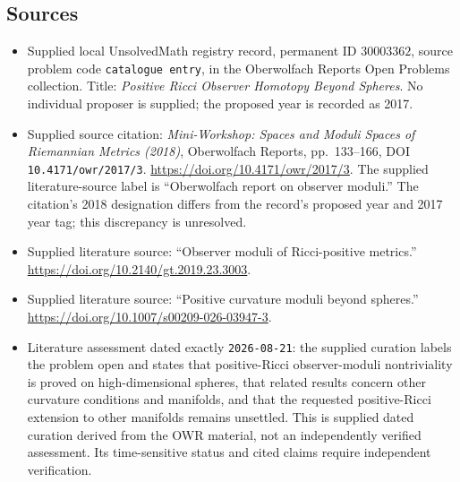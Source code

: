 \documentclass[11pt]{article}
\begin{document}
\subsection{Sources}
\begin{itemize}
\item Supplied local UnsolvedMath registry record, permanent ID \(30003362\), source problem code \texttt{catalogue entry}, in the Oberwolfach Reports Open Problems collection. Title: \emph{Positive Ricci Observer Homotopy Beyond Spheres}. No individual proposer is supplied; the proposed year is recorded as 2017.
\item Supplied source citation: \emph{Mini-Workshop: Spaces and Moduli Spaces of Riemannian Metrics (2018)}, Oberwolfach Reports, pp.~133--166, DOI \texttt{10.4171/owr/2017/3}. \url{https://doi.org/10.4171/owr/2017/3}. The supplied literature-source label is ``Oberwolfach report on observer moduli.'' The citation's 2018 designation differs from the record's proposed year and 2017 year tag; this discrepancy is unresolved.
\item Supplied literature source: ``Observer moduli of Ricci-positive metrics.'' \url{https://doi.org/10.2140/gt.2019.23.3003}.
\item Supplied literature source: ``Positive curvature moduli beyond spheres.'' \url{https://doi.org/10.1007/s00209-026-03947-3}.
\item Literature assessment dated exactly \texttt{2026-08-21}: the supplied curation labels the problem open and states that positive-Ricci observer-moduli nontriviality is proved on high-dimensional spheres, that related results concern other curvature conditions and manifolds, and that the requested positive-Ricci extension to other manifolds remains unsettled. This is supplied dated curation derived from the OWR material, not an independently verified assessment. Its time-sensitive status and cited claims require independent verification.
\end{itemize}
\end{document}
